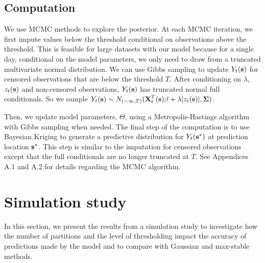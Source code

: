 \documentclass[useAMS,usenatbib,referee]{biom}
\begin{document}
\subsection{Computation}\label{s:comp}
We use MCMC methods to explore the posterior.
At each MCMC iteration, we first impute values below the threshold conditional on observations above the threshold.
This is feasible for large datasets with our model because for a single day, conditional on the model parameters, we only need to draw from a truncated multivariate normal distribution.
We can use Gibbs sampling to update $Y_t(\mbox{\bf s})$ for censored observations that are below the threshold $T$.
After conditioning on $\lambda$, $z_t(\mbox{\bf s})$ and non-censored observations, $Y_t(\mbox{\bf s})$ has truncated normal full conditionals.
So we sample $Y_t(\mbox{\bf s}) \sim N_{(-\infty, T)}(\mbox{\bf X}_t^T(\mbox{\bf s}) \beta + \lambda | z_t(\mbox{\bf s})|, \mbox{\boldmath $\Sigma$})$.

Then, we update model parameters, $\Theta$, using a Metropolis-Hastings algorithm with Gibbs sampling when needed.
The final step of the computation is to use Bayesian Kriging to generate a predictive distribution for $Y_t(\mbox{\bf s}^*)$ at prediction location $\mbox{\bf s}^*$.
This step is similar to the imputation for censored observations except that the full conditionals are no longer truncated at $T$.
See Appendices A.1 and A.2 for details regarding the MCMC algorithm.

\section{Simulation study}\label{s:simstudy}
In this section, we present the results from a simulation study to investigate how the number of partitions and the level of thresholding impact the accuracy of predictions made by the model and to compare with Gaussian and max-stable methods.
\end{document}
